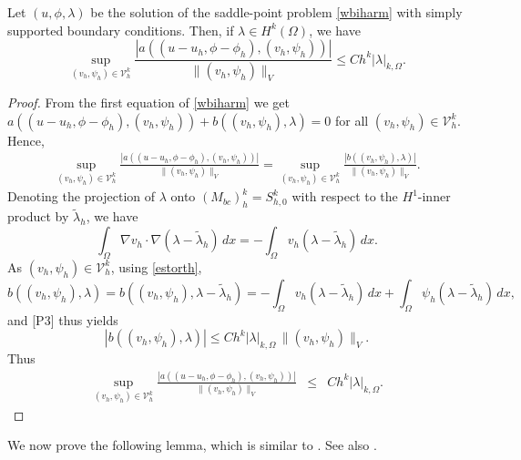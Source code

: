 \documentclass[a4paper,final]{siamltex}
\newcommand{\CV}{\mathcal{V}}
\newcommand{\Mb}{{(M_{bc})}}
\begin{document}
\begin{lemma}\label{lemma2} 
Let $(u,\phi,{\lambda})$ be the solution of the saddle-point problem 
\eqref{wbiharm} with simply supported boundary conditions.  Then, if $\lambda \in H^k(\Omega)$, we have 
\[ \sup_{(v_h,\psi_h) \in \CV^k_h} \frac{|a((u-u_h,\phi-\phi_h), (v_h,\psi_h))|}
{\|(v_h,\psi_h)\|_{V}} \leq C h^k |\lambda|_{k,\Omega}. \]
\end{lemma}
\begin{proof}
From the first equation of  \eqref{wbiharm} we  get
 $a((u-u_h,\phi-\phi_h),(v_h,\psi_h))+ b((v_h,\psi_h),\lambda)=0$ for all 
$(v_h,\psi_h) \in \CV^k_h$. Hence, 
\begin{eqnarray*} 
\sup_{(v_h,\psi_h) \in \CV^k_h} \frac{|a((u-u_h,\phi-\phi_h), (v_h,\psi_h))|}
{\|(v_h,\psi_h)\|_{V}} =
\sup_{(v_h,\psi_h) \in \CV^k_h} \frac{|b( (v_h,\psi_h),\lambda)|}
{\|(v_h,\psi_h)\|_{V}}.
\end{eqnarray*}
Denoting the projection of $\lambda$ onto $\Mb^k_h=S_{h,0}^k$ with respect to the
$H^1$-inner product by {$\tilde\lambda_h$}, we have 
\begin{equation}\label{estorth}
 \int_{\Omega} \nabla v_h \cdot \nabla (\lambda-\tilde \lambda_h)\,dx = 
-\int_{\Omega} v_h (\lambda-\tilde \lambda_h)\,dx.
\end{equation}
As $(v_h,\psi_h) \in \CV^k_h$, using \eqref{estorth},
\[ b((v_h,\psi_h),\lambda)= b((v_h,\psi_h),\lambda-\tilde \lambda_h)= 
-\int_{\Omega} v_h (\lambda-\tilde \lambda_h)\,dx + 
\int_{\Omega} \psi_h (\lambda-\tilde \lambda_h)\,dx,
\]
and [P3] thus yields
\[ |b((v_h,\psi_h),\lambda)|\leq C h^k |\lambda|_{k,\Omega}\,\|(v_h, \psi_h)\|_{V}.\]
Thus 
\begin{eqnarray*}
\sup_{(v_h,\psi_h) \in \CV^k_h} \frac{|a((u-u_h,\phi-\phi_h), (v_h,\psi_h))|}
{\|(v_h,\psi_h)\|_{V}} 
&\leq& C h^k |\lambda|_{k,\Omega}.
\end{eqnarray*}
\end{proof}

We now prove the following lemma, which is 
similar  to \cite[Proposition~3]{DP01}. See also \cite{Lam11a}.
\end{document}
